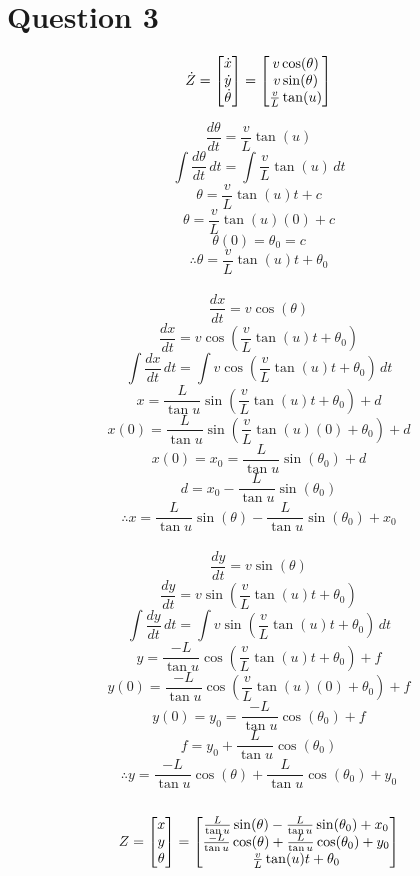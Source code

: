 \documentclass[a4paper,16pt,reqno]{article}
\begin{document}
\section{Question 3}

\begin{equation*}
\dot{Z} = 
\begin{bmatrix}
\dot{x}\cr
\dot{y}\cr
\dot{\theta}\cr
\end{bmatrix}
=
\begin{bmatrix}
v\cos(\theta)\cr
v\sin(\theta)\cr
\frac{v}{L}\tan(u)\cr
\end{bmatrix}
\end{equation*}

\[\frac{d\theta}{dt} = \frac{v}{L}\tan(u)\]
\[\int \frac{d\theta}{dt}\,dt = \int \frac{v}{L}\tan(u)\,dt \]
\[\theta = \frac{v}{L}\tan(u)t + c\]
\[\theta = \frac{v}{L}\tan(u)(0) + c\]
\[\theta(0) = \theta_0 = c\]
\[\therefore \theta = \frac{v}{L}\tan(u)t + \theta_0\]\\


\[\frac{dx}{dt} = v\cos(\theta)\]
\[\frac{dx}{dt} = v\cos(\frac{v}{L}\tan(u)t + \theta_0)\]
\[\int \frac{dx}{dt}\, dt = \int v\cos(\frac{v}{L}\tan(u)t + \theta_0)\, dt\]
\[x= \frac{L}{\tan{u}}\sin(\frac{v}{L}\tan(u)t + \theta_0) + d\]
\[x(0)= \frac{L}{\tan{u}}\sin(\frac{v}{L}\tan(u)(0) + \theta_0) + d\]
\[x(0)= x_0 = \frac{L}{\tan{u}}\sin(\theta_0) + d\]
\[d = x_0 - \frac{L}{\tan{u}}\sin(\theta_0)\]
\[\therefore x= \frac{L}{\tan{u}}\sin(\theta) - \frac{L}{\tan{u}}\sin(\theta_0) + x_0\]\\


\[\frac{dy}{dt} = v\sin(\theta)\]
\[\frac{dy}{dt} = v\sin(\frac{v}{L}\tan(u)t + \theta_0)\]
\[\int \frac{dy}{dt}\, dt = \int v\sin(\frac{v}{L}\tan(u)t + \theta_0)\, dt\]
\[y = \frac{-L}{\tan{u}}\cos(\frac{v}{L}\tan(u)t + \theta_0) + f\]
\[y(0) = \frac{-L}{\tan{u}}\cos(\frac{v}{L}\tan(u)(0) + \theta_0) + f\]
\[y(0)= y_0 = \frac{-L}{\tan{u}}\cos(\theta_0) + f\]
\[f = y_0 + \frac{L}{\tan{u}}\cos(\theta_0)\]
\[\therefore y= \frac{-L}{\tan{u}}\cos(\theta) + \frac{L}{\tan{u}}\cos(\theta_0) + y_0\]\\


\begin{equation*}
Z = 
\begin{bmatrix}
x\\
y\\
\theta
\end{bmatrix}
=
\begin{bmatrix}
\frac{L}{\tan{u}}\sin(\theta) - \frac{L}{\tan{u}}\sin(\theta_0) + x_0\cr
\frac{-L}{\tan{u}}\cos(\theta) + \frac{L}{\tan{u}}\cos(\theta_0) + y_0\cr
\frac{v}{L}\tan(u)t + \theta_0\cr
\end{bmatrix}
\end{equation*}
\end{document}
